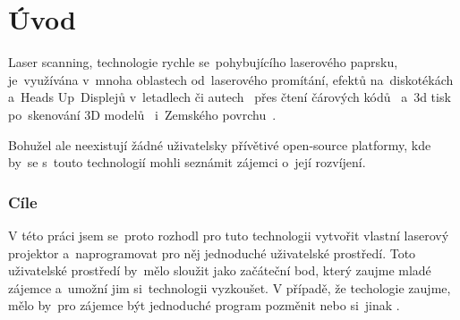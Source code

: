 \chapter*{Úvod}


Laser scanning, technologie rychle se~pohybujícího laserového paprsku, je~využívána v~mnoha oblastech od~laserového promítání, efektů na~diskotékách a~Heads Up~Displejů v~letadlech či autech~\cite{huds-in-driving} přes čtení čárových kódů~\cite{history-of-barcode-scanning} a~3d tisk~\cite{Photo-curing-3D-printing} po~skenování 3D modelů~\cite{3d-model-scan} i~Zemského povrchu~\cite{heightmaps}.

Bohužel ale neexistují žádné uživatelsky přívětivé open-source platformy, kde by~se s~touto technologií mohli seznámit zájemci o~její rozvíjení.

\subsection*{Cíle}
V této práci jsem se~proto rozhodl pro tuto technologii vytvořit vlastní laserový projektor a~naprogramovat pro něj jednoduché uživatelské prostředí.
Toto uživatelské prostředí by~mělo sloužit jako začáteční bod, který zaujme mladé zájemce a~umožní jim si~technologii vyzkoušet.
V případě, že techologie zaujme, mělo by~pro zájemce být jednoduché program pozměnit nebo si~jinak .
